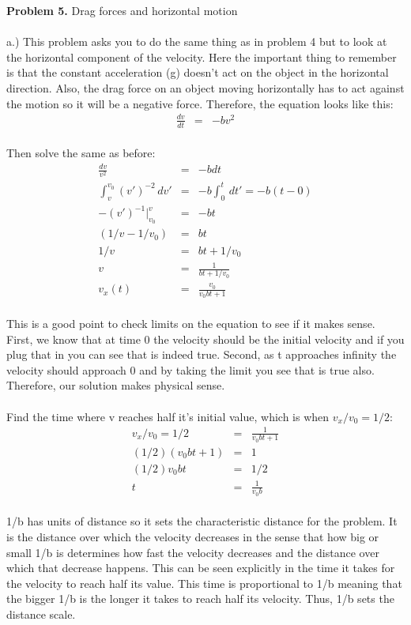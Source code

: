 \documentclass[11pt]{amsart}
\begin{document}
\newpage
\textbf{Problem 5.} Drag forces and horizontal motion \\ \\
a.) This problem asks you to do the same thing as in problem 4 but to look at the horizontal component of the velocity. Here the important thing to remember is that the constant acceleration (g) doesn't act on the object in the horizontal direction. Also, the drag force on an object moving horizontally has to act against the motion so it will be a negative force. Therefore, the equation looks like this: \\
\begin{eqnarray*}
\frac{dv}{dt} &=& -bv^{2}  
\end{eqnarray*} \\
Then solve the same as before: \\
\begin{eqnarray*}
\frac{dv}{v^{2}} &=& -bdt \\
\int^{v_{0}}_{v}(v')^{-2}\,dv' &=& -b\int^{t}_{0}\,dt' =-b(t-0) \\
-(v')^{-1}|^{v}_{v_{0}} &=& -bt \\
(1/v - 1/v_{0}) &=& bt \\
1/v &=& bt +1/v_{0} \\
v &=& \frac{1}{bt + 1/v_{0}} \\ 
v_{x}(t) &=& \frac{v_{0}}{v_{0}bt + 1} 
\end{eqnarray*}  \\
This is a good point to check limits on the equation to see if it makes sense. First, we know that at time 0 the velocity should be the initial velocity and if you plug that in you can see that is indeed true. Second, as t approaches infinity the velocity should approach 0 and by taking the limit you see that is true also. Therefore, our solution makes physical sense. \\ \\
Find the time where v reaches half it's initial value, which is when $v_{x}/v_{0}=1/2$: \\ 
\begin{eqnarray*} 
v_{x}/v_{0} = 1/2 &=& \frac{1}{v_{0}bt+1} \\
(1/2)(v_{0}bt+1) &=& 1 \\
(1/2)v_{0}bt &=& 1/2 \\
t &=& \frac{1}{v_{0}b} 
\end{eqnarray*} \\
1/b has units of distance so it sets the characteristic distance for the problem. It is the distance over which the velocity decreases in the sense that how big or small 1/b is determines how fast the velocity decreases and the distance over which that decrease happens. This can be seen explicitly in the time it takes for the velocity to reach half its value. This time is proportional to 1/b meaning that the bigger 1/b is the longer it takes to reach half its velocity. Thus, 1/b sets the distance scale. \\ \\
\end{document}
